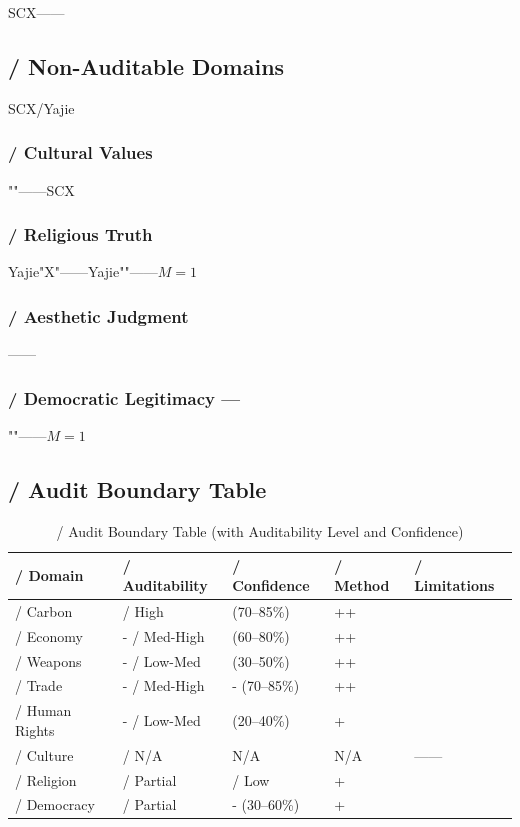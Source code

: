 \documentclass[12pt,a4paper]{article}
\theoremstyle{remark}
\begin{document}
SCX——

\subsection{ / Non-Auditable Domains}

SCX/Yajie

\subsubsection{ / Cultural Values}

""——SCX\textbf{}

\subsubsection{ / Religious Truth}

Yajie"X"——Yajie""——$M=1$

\subsubsection{ / Aesthetic Judgment}

——

\subsubsection{ / Democratic Legitimacy — }

""——$M=1$

\subsection{ / Audit Boundary Table}

\begin{table}[H]
\centering
\begin{tabular}{p{2.5cm} p{2cm} p{1.5cm} p{3.5cm} p{3.5cm}}
    \toprule
    \textbf{ / Domain} & \textbf{ / Auditability} & \textbf{ / Confidence} & \textbf{ / Method} & \textbf{ / Limitations} \\
    \midrule
     / Carbon &  / High &  (70--85\%) & ++ &  \\
    \midrule
     / Economy & - / Med-High &  (60--80\%) & ++ &  \\
    \midrule
     / Weapons & - / Low-Med &  (30--50\%) & ++ &  \\
    \midrule
     / Trade & - / Med-High & - (70--85\%) & ++ &  \\
    \midrule
     / Human Rights & - / Low-Med &  (20--40\%) & + &  \\
    \midrule
     / Culture &  / N/A & N/A & N/A & —— \\
    \midrule
     / Religion &  / Partial &  / Low & + &  \\
    \midrule
     / Democracy &  / Partial & - (30--60\%) & + &  \\
    \bottomrule
\end{tabular}
\caption{/ Audit Boundary Table (with Auditability Level and Confidence)}
\end{table}
\end{document}
